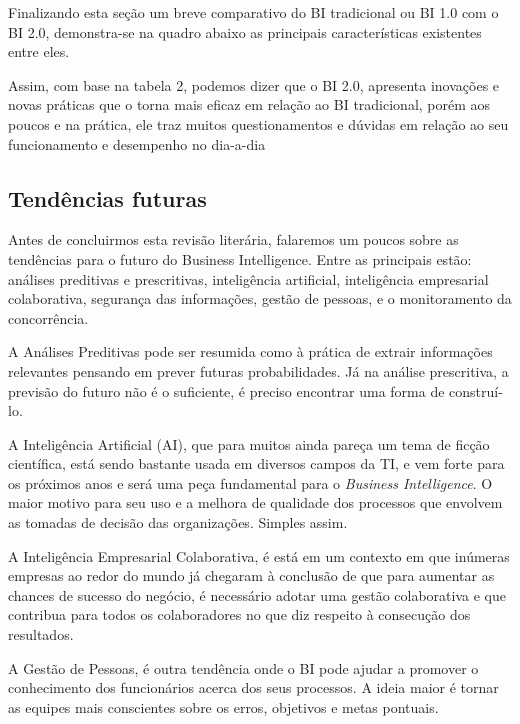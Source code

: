 Finalizando esta se\c{c}\~{a}o um breve comparativo do BI tradicional ou BI 1.0 com o BI 2.0, demonstra-se na quadro abaixo as principais características existentes entre eles.



Assim, com base na tabela 2, podemos dizer que o BI 2.0, apresenta inova\c{c}ões e novas pr\'{a}ticas que o torna mais eficaz em rela\c{c}\~{a}o ao BI tradicional, por\'{e}m aos poucos e na pr\'{a}tica, ele traz muitos questionamentos e dúvidas em rela\c{c}\~{a}o ao seu funcionamento e desempenho no dia-a-dia

\subsection{Tendências futuras}

Antes de concluirmos esta revis\~{a}o liter\'{a}ria, falaremos um poucos sobre as tendências para o futuro do Business Intelligence. Entre as principais est\~{a}o: an\'{a}lises preditivas e prescritivas, inteligência artificial, inteligência empresarial colaborativa, seguran\c{c}a das informa\c{c}ões, gest\~{a}o de pessoas, e o monitoramento da concorrência.

A An\'{a}lises Preditivas pode ser resumida como \`{a} pr\'{a}tica de extrair informa\c{c}ões relevantes pensando em prever futuras probabilidades. J\'{a} na an\'{a}lise prescritiva, a previs\~{a}o do futuro n\~{a}o \'{e} o suficiente, \'{e} preciso encontrar uma forma de construí-lo.

A Inteligência Artificial (AI), que para muitos ainda pare\c{c}a um tema de fic\c{c}\~{a}o científica, est\'{a} sendo bastante usada em diversos campos da TI, e vem forte para os próximos anos e ser\'{a} uma pe\c{c}a fundamental para o \textit{Business Intelligence}. O maior motivo para seu uso e a melhora de qualidade dos processos que envolvem as tomadas de decis\~{a}o das organiza\c{c}ões. Simples assim.

A Inteligência Empresarial Colaborativa, \'{e} est\'{a} em um contexto em que inúmeras empresas ao redor do mundo j\'{a} chegaram \`{a} conclus\~{a}o de que para aumentar as chances de sucesso do negócio, \'{e} necess\'{a}rio adotar uma gest\~{a}o colaborativa e que contribua para todos os colaboradores no que diz respeito \`{a} consecu\c{c}\~{a}o dos resultados.

A Gest\~{a}o de Pessoas, \'{e} outra tendência onde o BI pode ajudar a promover o conhecimento dos funcion\'{a}rios acerca dos seus processos. A ideia maior \'{e} tornar as equipes mais conscientes sobre os erros, objetivos e metas pontuais.

